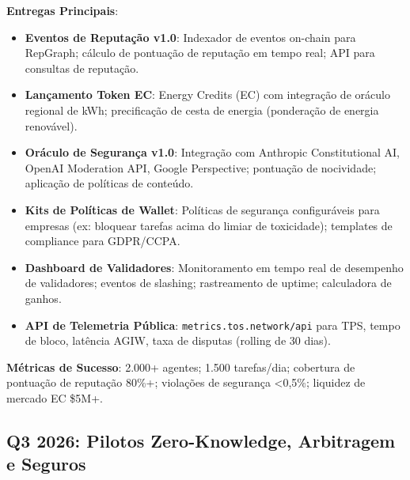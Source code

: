 \documentclass[11pt]{article}
\begin{document}
\begin{itemize}[noitemsep]
\begin{itemize}[noitemsep]
\begin{itemize}[noitemsep]
\textbf{Entregas Principais}:
\begin{itemize}[noitemsep]
  \item \textbf{Eventos de Reputação v1.0}: Indexador de eventos on-chain para RepGraph; cálculo de pontuação de reputação em tempo real; API para consultas de reputação.
  \item \textbf{Lançamento Token EC}: Energy Credits (EC) com integração de oráculo regional de kWh; precificação de cesta de energia (ponderação de energia renovável).
  \item \textbf{Oráculo de Segurança v1.0}: Integração com Anthropic Constitutional AI, OpenAI Moderation API, Google Perspective; pontuação de nocividade; aplicação de políticas de conteúdo.
  \item \textbf{Kits de Políticas de Wallet}: Políticas de segurança configuráveis para empresas (ex: bloquear tarefas acima do limiar de toxicidade); templates de compliance para GDPR/CCPA.
  \item \textbf{Dashboard de Validadores}: Monitoramento em tempo real de desempenho de validadores; eventos de slashing; rastreamento de uptime; calculadora de ganhos.
  \item \textbf{API de Telemetria Pública}: \texttt{metrics.tos.network/api} para TPS, tempo de bloco, latência AGIW, taxa de disputas (rolling de 30 dias).
\end{itemize}

\textbf{Métricas de Sucesso}: 2.000+ agentes; 1.500 tarefas/dia; cobertura de pontuação de reputação 80\%+; violações de segurança <0,5\%; liquidez de mercado EC \$5M+.

\subsection{Q3 2026: Pilotos Zero-Knowledge, Arbitragem e Seguros}


\end{itemize}
\end{itemize}
\end{itemize}
\end{document}
